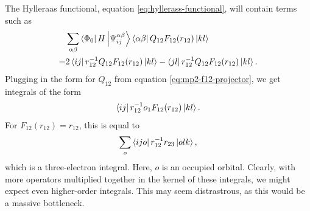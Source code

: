 The Hylleraas functional, equation \ref{eq:hyllerass-functional}, will contain terms such as
\begin{align}
    &\sum_{\alpha\beta}\bra{\Phi_0}H\ket{\Psi_{ij}^{\alpha\beta}} \bra{\alpha\beta}Q_{12}F_{12}(r_{12})\ket{kl} \nonumber\\=& 2\bra{ij}r_{12}^{-1}Q_{12}F_{12}(r_{12})\ket{kl} - \bra{jl}r_{12}^{-1}Q_{12}F_{12}(r_{12})\ket{kl}.
\end{align}
Plugging in the form for $Q_{12}$ from equation \ref{eq:mp2-f12-projector}, we get integrals of the form
\begin{equation}
    \bra{ij}r_{12}^{-1}o_1F_{12}(r_{12})\ket{kl}.
\end{equation}
For $F_{12}(r_{12})=r_{12}$, this is equal to
\begin{equation}
    \sum_o\bra{ijo}r_{12}^{-1}r_{23}\ket{olk},
\end{equation}
which is a three-electron integral. Here, $o$ is an occupied orbital. Clearly, with more operators multiplied together in the kernel of these integrals, we might expect even higher-order integrals. This may seem distrastrous, as this would be a massive bottleneck.


